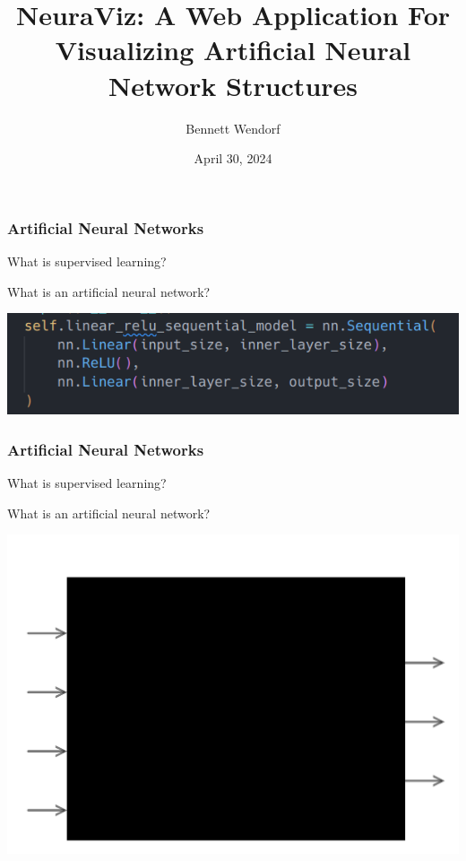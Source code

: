 \documentclass{beamer}
\title{NeuraViz: A Web Application For Visualizing Artificial Neural Network Structures}
\author{Bennett Wendorf}
\institute{University of Wisconsin - La Crosse}
\date{April 30, 2024}
\begin{document}
 
\frame{\titlepage}

\begin{frame}
    \frametitle{Artificial Neural Networks}
    \begin{block}{}
        What is supervised learning?
    \end{block}
    \pause
    \begin{block}{}
        What is an artificial neural network?
    \end{block}
    \pause
    \vspace{0.75cm}
    \centering
    \includegraphics[scale=0.6]{./res/pytorch_code.png}
\end{frame}

\begin{frame}
    \frametitle{Artificial Neural Networks}
    \begin{block}{}
        What is supervised learning?
    \end{block}
    \begin{block}{}
        What is an artificial neural network?
    \end{block}
    \centering
    \includegraphics[scale=0.15]{./res/black_box.png}
\end{frame}
\end{document}
